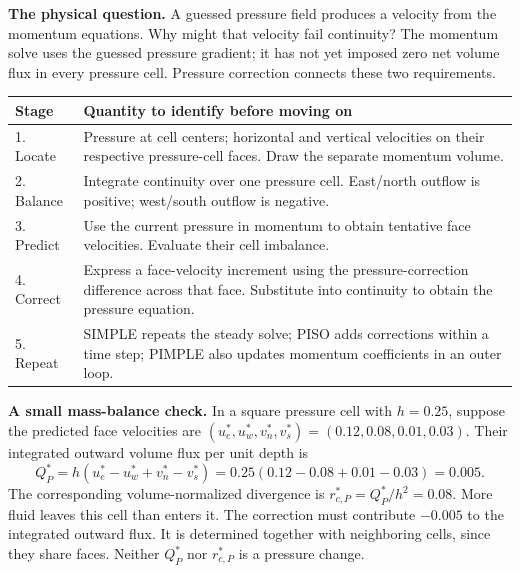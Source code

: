 \textbf{The physical question.} A guessed pressure field produces a velocity
from the momentum equations. Why might that velocity fail continuity?
The momentum solve uses the guessed pressure gradient; it has not yet imposed
zero net volume flux in every pressure cell. Pressure correction connects these
two requirements.

\begin{center}\begin{tabular}{p{.19\linewidth}p{.69\linewidth}}\toprule
Stage & Quantity to identify before moving on\\\midrule
1. Locate & Pressure at cell centers; horizontal and vertical velocities on their respective pressure-cell faces. Draw the separate momentum volume.\\
2. Balance & Integrate continuity over one pressure cell. East/north outflow is positive; west/south outflow is negative.\\
3. Predict & Use the current pressure in momentum to obtain tentative face velocities. Evaluate their cell imbalance.\\
4. Correct & Express a face-velocity increment using the pressure-correction difference across that face. Substitute into continuity to obtain the pressure equation.\\
5. Repeat & SIMPLE repeats the steady solve; PISO adds corrections within a time step; PIMPLE also updates momentum coefficients in an outer loop.\\\bottomrule
\end{tabular}\end{center}

\textbf{A small mass-balance check.} In a square pressure cell with $h=0.25$,
suppose the predicted face velocities are
$(u_e^*,u_w^*,v_n^*,v_s^*)=(0.12,0.08,0.01,0.03)$.
Their integrated outward volume flux per unit depth is
\[
Q_P^*=h(u_e^*-u_w^*+v_n^*-v_s^*)
=0.25(0.12-0.08+0.01-0.03)=0.005.
\]
The corresponding volume-normalized divergence is
$r_{c,P}^*=Q_P^*/h^2=0.08$. More fluid leaves this cell than enters it.
The correction must contribute $-0.005$ to the integrated outward flux.
It is determined together with neighboring cells, since they share faces.
Neither $Q_P^*$ nor $r_{c,P}^*$ is a pressure change.

